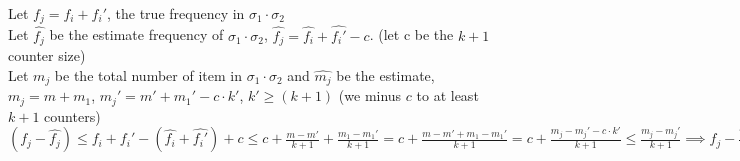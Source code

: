 \documentclass[11pt]{article}
\begin{document}
\begin{solution}
\begin{enumerate}
    Let $f_j = f_i + f_i'$, the true frequency in $\sigma_1 \cdot \sigma_2$\\
    
    Let $\hat{f_j}$ be the estimate frequency of $\sigma_1 \cdot \sigma_2$, $\hat{f_j} = \hat{f_i} + \hat{f_i'} - c$. (let c be the $k+1$ counter size)\\
    
    Let $m_j$ be the total number of item in $\sigma_1 \cdot \sigma_2$ and $\hat{m_j}$ be the estimate, $m_j = m + m_1$, $m_j' = m' + m_1' - c \cdot k'$, $k' \geq (k+1)$ (we minus $c$ to at least $k+1$ counters)\\
    
    $(f_j - \hat{f_j}) \leq f_i + f_i' - (\hat{f_i} + \hat{f_i'}) + c \leq c + \frac{m - m'}{k+1} + \frac{m_1 - m_1'}{k+1} = c + \frac{m - m' + m_1 - m_1'}{k + 1} = c + \frac{m_j - m_j' - c \cdot k'}{k+1} \leq \frac{m_j - m_j'}{k + 1} \implies f_j - \frac{m_j - m_j'}{k + 1} \leq \hat{f_j}\leq f_j$\\

\end{enumerate}

\end{solution}
\end{document}
